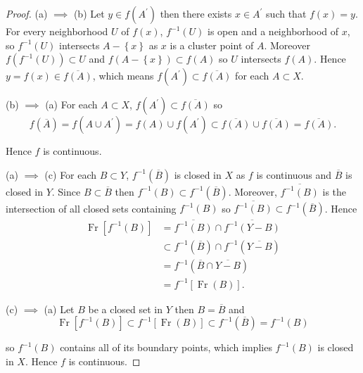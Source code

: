 \begin{proof}
    (a) \( \implies \) (b) Let \( y \in f(A^{\prime}) \) then there exists \( x \in A^{\prime} \) such that \( f(x) = y \). For every neighborhood \( U \) of \( f(x) \), \( f^{-1}(U) \) is open and a neighborhood of \( x \), so \( f^{-1}(U) \) intersects \( A - \left\{ x \right\} \) as \( x \) is a cluster point of \( A \). Moreover \( f(f^{-1}(U)) \subset U \) and \( f(A - \left\{x\right\}) \subset f(A) \) so \( U \) intersects \( f(A) \). Hence \( y = f(x) \in \overline{f(A)} \), which means \( f(A^{\prime}) \subset \overline{f(A)} \) for each \( A \subset X \).

    (b) \( \implies \) (a) For each \( A \subset X \), \( f(A^{\prime}) \subset \overline{f(A)} \) so
    \[
        f(\overline{A}) = f(A \cup A^{\prime}) = f(A) \cup f(A^{\prime}) \subset \overline{f(A)} \cup \overline{f(A)} = \overline{f(A)}.
    \]

    Hence \( f \) is continuous.

    (a) \( \implies \) (c) For each \( B \subset Y \), \( f^{-1}(\overline{B}) \) is closed in \( X \) as \( f \) is continuous and \( \overline{B} \) is closed in \( Y \). Since \( B \subset \overline{B} \) then \( f^{-1}(B) \subset f^{-1}(\overline{B}) \). Moreover, \( \overline{f^{-1}(B)} \) is the intersection of all closed sets containing \( f^{-1}(B) \) so \( \overline{f^{-1}(B)} \subset f^{-1}(\overline{B}) \). Hence
    \begingroup
    \allowdisplaybreaks%
    \begin{align*}
        \operatorname{Fr}\left\lbrack f^{-1}(B) \right\rbrack & = \overline{f^{-1}(B)} \cap \overline{f^{-1}(Y - B)}       \\
                                                              & \subset f^{-1}(\overline{B}) \cap f^{-1}(\overline{Y - B}) \\
                                                              & = f^{-1}(\overline{B} \cap \overline{Y - B})               \\
                                                              & = f^{-1}\left\lbrack \operatorname{Fr}(B) \right\rbrack.
    \end{align*}
    \endgroup

    (c) \( \implies \) (a) Let \( B \) be a closed set in \( Y \) then \( B = \overline{B} \) and
    \[
        \operatorname{Fr}\left\lbrack f^{-1}(B) \right\rbrack \subset f^{-1}\left\lbrack \operatorname{Fr}(B) \right\rbrack \subset f^{-1}(\overline{B}) = f^{-1}(B)
    \]

    so \( f^{-1}(B) \) contains all of its boundary points, which implies \( f^{-1}(B) \) is closed in \(X\). Hence \( f \) is continuous.
\end{proof}


